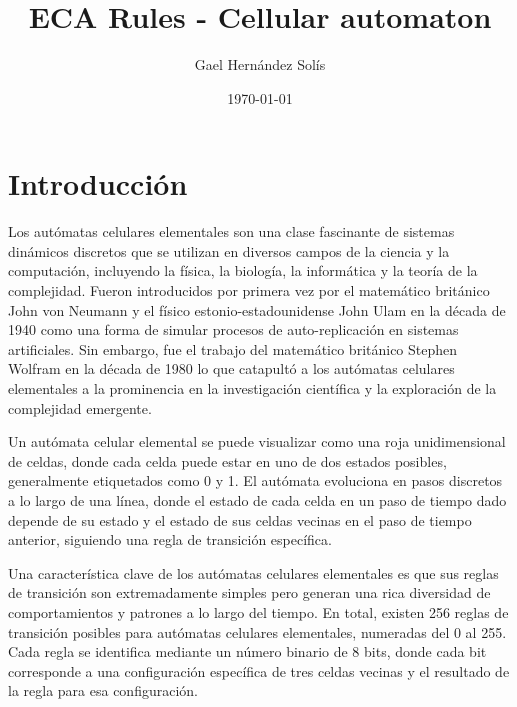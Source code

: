 \documentclass{article}
\title{ECA Rules - Cellular automaton}
\author{Gael Hernández Solís}
\date{\today}
\begin{document}
	\begin{titlepage}
		\maketitle
	\end{titlepage}
	
	\newpage 
	
	\pagestyle{fancy}
	\lhead{}
	\chead{}
	\rhead{}
	\lfoot{}
	\cfoot{\thepage}
	\rfoot{}
	
	\tableofcontents 
	
	\newpage 
	

	\renewcommand{\cftsecfont}{\normalfont}
	\renewcommand{\cftsubsecfont}{\normalfont\itshape}
	\renewcommand{\cftsecleader}{\cftdotfill{\cftdotsep}}
	\renewcommand{\cftsubsecleader}{\cftdotfill{\cftdotsep}}
	\addtocontents{toc}{\protect\renewcommand{\protect\cftsecleader}{\protect\cftdotfill{\protect\cftdotsep}}}
	
	\section{Introducción}
	
	Los autómatas celulares elementales son una clase fascinante de sistemas dinámicos discretos que se utilizan en diversos campos de la ciencia y la computación, incluyendo la física, la biología, la informática y la teoría de la complejidad. Fueron introducidos por primera vez por el matemático británico John von Neumann y el físico estonio-estadounidense John Ulam en la década de 1940 como una forma de simular procesos de auto-replicación en sistemas artificiales. Sin embargo, fue el trabajo del matemático británico Stephen Wolfram en la década de 1980 lo que catapultó a los autómatas celulares elementales a la prominencia en la investigación científica y la exploración de la complejidad emergente.
	
	Un autómata celular elemental se puede visualizar como una roja unidimensional de celdas, donde cada celda puede estar en uno de dos estados posibles, generalmente etiquetados como 0 y 1. El autómata evoluciona en pasos discretos a lo largo de una línea, donde el estado de cada celda en un paso de tiempo dado depende de su estado y el estado de sus celdas vecinas en el paso de tiempo anterior, siguiendo una regla de transición específica.
	
	Una característica clave de los autómatas celulares elementales es que sus reglas de transición son extremadamente simples pero generan una rica diversidad de comportamientos y patrones a lo largo del tiempo. En total, existen 256 reglas de transición posibles para autómatas celulares elementales, numeradas del 0 al 255. Cada regla se identifica mediante un número binario de 8 bits, donde cada bit corresponde a una configuración específica de tres celdas vecinas y el resultado de la regla para esa configuración.
	
\end{document}
